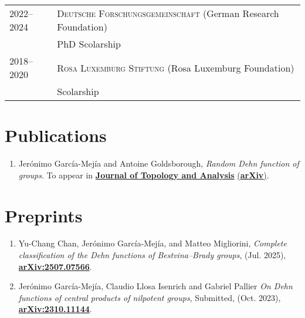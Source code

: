 \documentclass[a4paper,11pt]{article} %
\begin{document}
\begin{longtable}{>{\raggedleft\arraybackslash}p{4cm}p{10cm}}

\textsc{2022--2024} & \textsc{Deutsche Forschungsgemeinschaft} \small (German Research Foundation)\vspace{0.2em}\\
& PhD Scolarship \vspace{0.2em}\\

\textsc{2018--2020} & \textsc{Rosa Luxemburg Stiftung} \small (Rosa Luxemburg Foundation)\vspace{0.2em}\\
& Scolarship
\end{longtable}


\section{Publications}

\begin{minipage}{15cm}
\begin{enumerate}[align=right, itemsep=.5em, leftmargin=1.8em]
	
	\item Jerónimo García-Mejía and Antoine Goldsborough, \emph{Random Dehn function of groups}. To appear in {\href{https://doi.org/10.1142/S179352532550027X}{\textbf{Journal of Topology and Analysis}}} {\href{https://arxiv.org/abs/2411.12715}{(\textbf{arXiv})}}.
    
\end{enumerate}
\end{minipage}

\section{Preprints}

\begin{minipage}{15cm}
\begin{enumerate}[align=right, itemsep=.5em, leftmargin=1.8em]
	
	\item Yu-Chang Chan, Jerónimo García-Mejía, and Matteo Migliorini, \emph{Complete classification of the Dehn functions of Bestvina--Brady groups}, (Jul. 2025), {\href{https://arxiv.org/abs/2507.07566}{\textbf{arXiv:2507.07566}}}.
    
    \item Jerónimo García-Mejía, Claudio Llosa Isenrich and Gabriel Pallier \emph{On Dehn functions of central products of nilpotent groups}, Submitted,  (Oct. 2023), {\href{https://arxiv.org/abs/2310.11144}{\textbf{arXiv:2310.11144}}}.
    
\end{enumerate}
\end{minipage}
\end{document}
